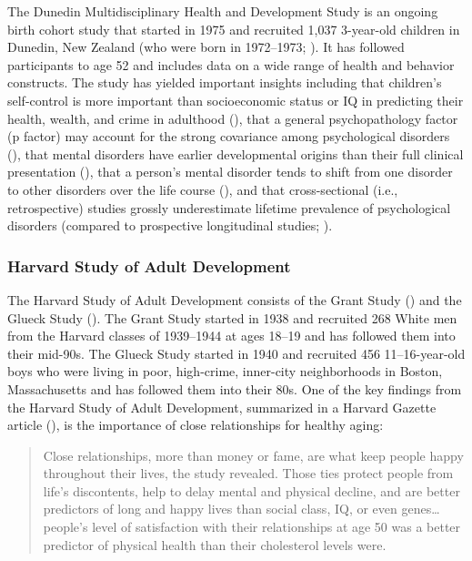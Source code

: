 \documentclass[
  american,
  letterpaper,
  12pt]{article}
\begin{document}
The Dunedin Multidisciplinary Health and Development Study is an ongoing
birth cohort study that started in 1975 and recruited 1,037 3-year-old
children in Dunedin, New Zealand (who were born in 1972--1973;
). It has followed
participants to age 52 and includes data on a wide range of health and
behavior constructs. The study has yielded important insights including
that children's self-control is more important than socioeconomic status
or IQ in predicting their health, wealth, and crime in adulthood
(), that a general
psychopathology factor (p factor) may account for the strong covariance
among psychological disorders (), that mental disorders have earlier developmental origins than
their full clinical presentation (), that a person's mental disorder tends to shift from one
disorder to other disorders over the life course
(), and that cross-sectional
(i.e., retrospective) studies grossly underestimate lifetime prevalence
of psychological disorders (compared to prospective longitudinal
studies; ).

\subsubsection{Harvard Study of Adult
Development}\label{harvard-study-of-adult-development}

The Harvard Study of Adult Development consists of the Grant Study
() and the Glueck Study
(). The Grant Study
started in 1938 and recruited 268 White men from the Harvard classes of
1939--1944 at ages 18--19 and has followed them into their mid-90s. The
Glueck Study started in 1940 and recruited 456 11--16-year-old boys who
were living in poor, high-crime, inner-city neighborhoods in Boston,
Massachusetts and has followed them into their 80s. One of the key
findings from the Harvard Study of Adult Development, summarized in a
Harvard Gazette article (), is the
importance of close relationships for healthy aging:

\begin{quote}
Close relationships, more than money or fame, are what keep people happy
throughout their lives, the study revealed. Those ties protect people
from life's discontents, help to delay mental and physical decline, and
are better predictors of long and happy lives than social class, IQ, or
even genes\ldots people's level of satisfaction with their relationships
at age 50 was a better predictor of physical health than their
cholesterol levels were.
\end{quote}
\end{document}
